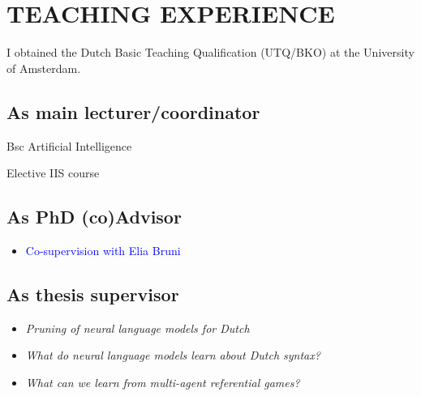 \section{TEACHING EXPERIENCE}

I obtained the Dutch Basic Teaching Qualification (UTQ/BKO) at the University of Amsterdam.\\

\subsection{As main lecturer/coordinator}
{
{Bsc Artificial Intelligence}

{
{Elective IIS course}

\subsection{As PhD (co)Advisor}
{
{\begin{itemize}
  \item[] \textcolor{blue}{\normalfont Co-supervision with Elia Bruni\vspace{1mm}}
\end{itemize}
}}

\subsection{As thesis supervisor}
{
{\begin{itemize}
  \item[] \textit{Pruning of neural language models for Dutch}
\end{itemize}
}}

{
{\begin{itemize}
  \item[] \textit{What do neural language models learn about Dutch syntax?}
\end{itemize}
}}

{
{\begin{itemize}
  \item[] \textit{What can we learn from multi-agent referential games?}
\end{itemize}
}}

}}
